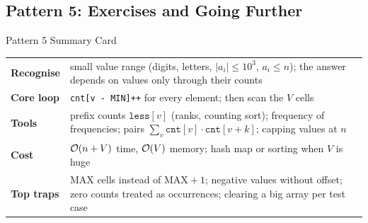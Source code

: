 \subsection{Pattern 5: Exercises and Going Further}
\label{ssec:ch1-p5-ex}

\begin{patternbox}{Pattern 5 Summary Card}
\begin{tabularx}{\linewidth}{@{}>{\bfseries}l X@{}}
Recognise & small value range (digits, letters, $|a_i| \le 10^3$, $a_i \le n$); the answer depends on values only through their counts \\
Core loop & \texttt{cnt[v - MIN]++} for every element; then scan the $V$ cells \\
Tools & prefix counts $\texttt{less}[v]$ (ranks, counting sort); frequency of frequencies; pairs $\sum_v \texttt{cnt}[v]\cdot\texttt{cnt}[v+k]$; capping values at $n$ \\
Cost & $\mathcal{O}(n + V)$ time, $\mathcal{O}(V)$ memory; hash map or sorting when $V$ is huge \\
Top traps & $\text{MAX}$ cells instead of $\text{MAX} + 1$; negative values without offset; zero counts treated as occurrences; clearing a big array per test case \\
\end{tabularx}
\end{patternbox}

